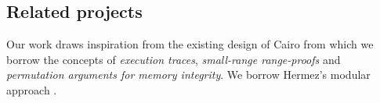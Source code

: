 \subsection{Related projects}
Our work draws inspiration from the existing design of Cairo \cite{cairo} from which we borrow the concepts of \textit{execution traces}, \textit{small-range range-proofs} and \textit{permutation arguments for memory integrity}. We borrow Hermez's modular approach \cite{HermezEthCC4}.